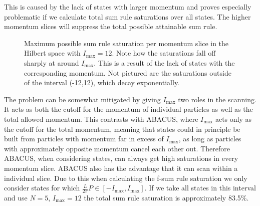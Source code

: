 \documentclass[11pt, a4paper]{report} %
\begin{document}
This is caused by the lack of states with larger momentum and proves especially problematic if we calculate total sum rule saturations over all states.
The higher momentum slices will suppress the total possible attainable sum rule.
\begin{figure}[tb!]
  \centering
   \caption{Maximum possible sum rule saturation per momentum slice in the Hilbert space with \(I_{\max}=12\). Note how the saturations fall off sharply at around \(I_{\max}\). This is a result of the lack of states with the corresponding momentum. Not pictured are the saturations outside of the interval (-12,12), which decay exponentially.}
   \label{fig:saturationsperslice}
\end{figure}


The problem can be somewhat mitigated by giving \(I_{\max}\) two roles in the scanning.
It acts as both the cutoff for the momentum of individual particles as well as the total allowed momentum.
This contrasts with ABACUS, where \(I_{\max}\) acts only as the cutoff for the total momentum, meaning that states could in principle be built from particles with momentum far in excess of \(I_{\max}\), as long as particles with approximately opposite momentum cancel each other out.
Therefore ABACUS, when considering states, can always get high saturations in every momentum slice.
ABACUS also has the advantage that it can scan within a individual slice.
Due to this when calculating the f-sum rule saturation we only consider states for which \(\frac{L}{2\pi}P \in [-I_{\max},I_{\max}]\).
If we take all states in this interval and use \(N = 5\), \(I_{\max}=12\) the total sum rule saturation is approximately 83.5\%.
\end{document}
